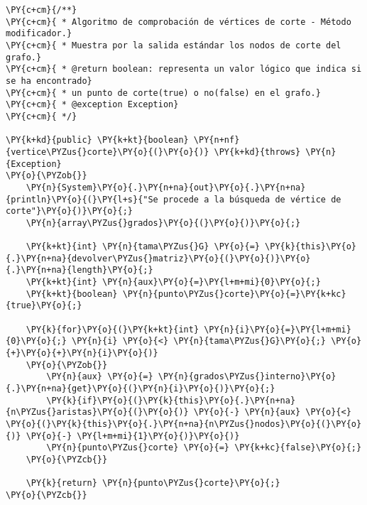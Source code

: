 \begin{Verbatim}[commandchars=\\\{\}]
\PY{c+cm}{/**}
\PY{c+cm}{ * Algoritmo de comprobación de vértices de corte - Método modificador.}
\PY{c+cm}{ * Muestra por la salida estándar los nodos de corte del grafo.}
\PY{c+cm}{ * @return boolean: representa un valor lógico que indica si se ha encontrado}
\PY{c+cm}{ * un punto de corte(true) o no(false) en el grafo.}
\PY{c+cm}{ * @exception Exception}
\PY{c+cm}{ */}

\PY{k+kd}{public} \PY{k+kt}{boolean} \PY{n+nf}{vertice\PYZus{}corte}\PY{o}{(}\PY{o}{)} \PY{k+kd}{throws} \PY{n}{Exception}
\PY{o}{\PYZob{}}
    \PY{n}{System}\PY{o}{.}\PY{n+na}{out}\PY{o}{.}\PY{n+na}{println}\PY{o}{(}\PY{l+s}{"Se procede a la búsqueda de vértice de corte"}\PY{o}{)}\PY{o}{;}
    \PY{n}{array\PYZus{}grados}\PY{o}{(}\PY{o}{)}\PY{o}{;}

    \PY{k+kt}{int} \PY{n}{tama\PYZus{}G} \PY{o}{=} \PY{k}{this}\PY{o}{.}\PY{n+na}{devolver\PYZus{}matriz}\PY{o}{(}\PY{o}{)}\PY{o}{.}\PY{n+na}{length}\PY{o}{;}
    \PY{k+kt}{int} \PY{n}{aux}\PY{o}{=}\PY{l+m+mi}{0}\PY{o}{;}
    \PY{k+kt}{boolean} \PY{n}{punto\PYZus{}corte}\PY{o}{=}\PY{k+kc}{true}\PY{o}{;}

    \PY{k}{for}\PY{o}{(}\PY{k+kt}{int} \PY{n}{i}\PY{o}{=}\PY{l+m+mi}{0}\PY{o}{;} \PY{n}{i} \PY{o}{<} \PY{n}{tama\PYZus{}G}\PY{o}{;} \PY{o}{+}\PY{o}{+}\PY{n}{i}\PY{o}{)}
	\PY{o}{\PYZob{}}
	    \PY{n}{aux} \PY{o}{=} \PY{n}{grados\PYZus{}interno}\PY{o}{.}\PY{n+na}{get}\PY{o}{(}\PY{n}{i}\PY{o}{)}\PY{o}{;}
	    \PY{k}{if}\PY{o}{(}\PY{k}{this}\PY{o}{.}\PY{n+na}{n\PYZus{}aristas}\PY{o}{(}\PY{o}{)} \PY{o}{-} \PY{n}{aux} \PY{o}{<} \PY{o}{(}\PY{k}{this}\PY{o}{.}\PY{n+na}{n\PYZus{}nodos}\PY{o}{(}\PY{o}{)} \PY{o}{-} \PY{l+m+mi}{1}\PY{o}{)}\PY{o}{)}
		\PY{n}{punto\PYZus{}corte} \PY{o}{=} \PY{k+kc}{false}\PY{o}{;}
	\PY{o}{\PYZcb{}}

    \PY{k}{return} \PY{n}{punto\PYZus{}corte}\PY{o}{;}
\PY{o}{\PYZcb{}}
\end{Verbatim}
